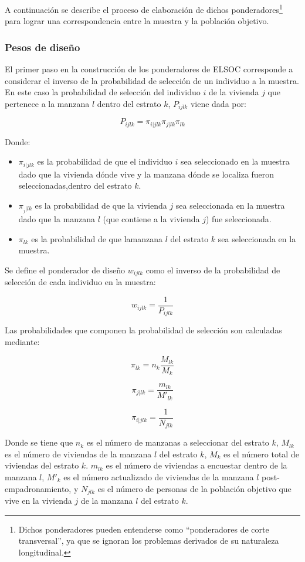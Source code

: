 \documentclass[
  12pt,
]{article}
\providecommand{\tightlist}{%
  \setlength{\itemsep}{0pt}\setlength{\parskip}{0pt}}
\begin{document}
A continuación se describe el proceso de elaboración de dichos ponderadores\footnote{Dichos ponderadores pueden entenderse como ``ponderadores de corte transversal'', ya que se ignoran los problemas derivados de su naturaleza longitudinal.} para lograr una correspondencia entre la muestra y la población objetivo.

\hypertarget{pesos-de-diseuxf1o}{%
\subsubsection{Pesos de diseño}\label{pesos-de-diseuxf1o}}

El primer paso en la construcción de los ponderadores de ELSOC corresponde a considerar el inverso de la probabilidad de selección de un individuo a la muestra. En este caso la probabilidad de selección del individuo \(i\) de la vivienda \(j\) que pertenece a la manzana \(l\) dentro del estrato \(k\), \(P_{ijlk}\) viene dada por:

\[P_{ijlk} = \pi_{i|jlk}\pi_{j|lk}\pi_{lk}\]

Donde:

\begin{itemize}
\tightlist
\item
  \(\pi_{i|jlk}\) es la probabilidad de que el individuo \(i\) sea seleccionado en la muestra dado que la vivienda dónde vive y la manzana dónde se localiza fueron seleccionadas,dentro del estrato \(k\).
\item
  \(\pi_{_j|lk}\) es la probabilidad de que la vivienda \(j\) sea seleccionada en la muestra dado que la manzana \(l\) (que contiene a la vivienda \(j\)) fue seleccionada.
\item
  \(\pi_{lk}\) es la probabilidad de que lamanzana \(l\) del estrato \(k\) sea seleccionada en la muestra.
\end{itemize}

Se define el ponderador de diseño \(w_{ijlk}\) como el inverso de la probabilidad de selección de cada individuo en la muestra:

\[w_{ijlk}=\frac{1}{ P_{ijlk}}\]

Las probabilidades que componen la probabilidad de selección son calculadas mediante:

\[\pi_{lk} = n_k\frac{M_{lk}}{M_k}\]

\[\pi_{j|lk} = \frac{m_{lk}}{M'_{lk}}\]

\[\pi_{i|jlk} = \frac{1}{N_{jlk}}\]

Donde se tiene que \(n_k\) es el número de manzanas a seleccionar del estrato \(k\), \(M_{lk}\) es el número de viviendas de la manzana \(l\) del estrato \(k\), \(M_k\) es el número total de viviendas del estrato \(k\). \(m_{lk}\) es el número de viviendas a encuestar dentro de la manzana \(l\), \(M'_k\) es el número actualizado de viviendas de la manzana \(l\) post-empadronamiento, y \(N_{jlk}\) es el número de personas de la
población objetivo que vive en la vivienda \(j\) de la manzana \(l\) del estrato \(k\).
\end{document}
